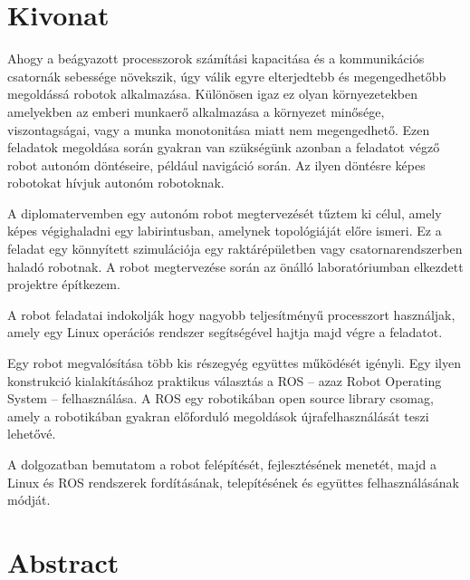 \setcounter{page}{1}

\selecthungarian

\chapter*{Kivonat}

Ahogy a beágyazott processzorok számítási kapacitása és a kommunikációs csatornák
sebessége növekszik, úgy válik egyre elterjedtebb és megengedhetőbb megoldássá
robotok alkalmazása. Különösen igaz ez olyan környezetekben amelyekben az emberi
munkaerő alkalmazása a környezet minősége, viszontagságai, vagy a munka
monotonitása miatt nem megengedhető. Ezen feladatok megoldása során gyakran van
szükségünk azonban a feladatot végző robot autonóm döntéseire, például navigáció
során. Az ilyen döntésre képes robotokat hívjuk autonóm robotoknak.

A diplomatervemben egy autonóm robot megtervezését tűztem ki célul, amely
képes végighaladni egy labirintusban, amelynek topológiáját előre ismeri. Ez a
feladat egy könnyített szimulációja egy raktárépületben vagy csatornarendszerben
haladó robotnak. A robot megtervezése során az önálló laboratóriumban elkezdett
projektre építkezem.

A robot feladatai indokolják hogy nagyobb teljesítményű processzort használjak,
amely egy Linux operációs rendszer segítségével hajtja majd végre a feladatot.

Egy robot megvalósítása több kis részegyég együttes működését igényli. Egy ilyen
konstrukció kialakításához praktikus választás a ROS -- azaz Robot Operating
System -- felhasználása. A ROS egy robotikában open source library csomag, amely
a robotikában gyakran előforduló megoldások újrafelhasználását teszi lehetővé.

A dolgozatban bemutatom a robot felépítését, fejlesztésének menetét, majd a
Linux és ROS rendszerek fordításának, telepítésének és együttes felhasználásának módját.

\vfill
\selectenglish


\chapter*{Abstract}

